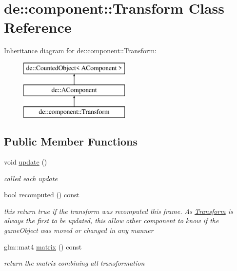 \hypertarget{classde_1_1component_1_1_transform}{
\section{de\-:\-:component\-:\-:\-Transform \-Class \-Reference}
\label{classde_1_1component_1_1_transform}
}
\-Inheritance diagram for de\-:\-:component\-:\-:\-Transform\-:\begin{figure}[H]
\begin{center}
\leavevmode
\includegraphics[height=3.000000cm]{classde_1_1component_1_1_transform}
\end{center}
\end{figure}
\subsection*{\-Public \-Member \-Functions}
\begin{DoxyCompactItemize}
\item 
\hypertarget{classde_1_1component_1_1_transform_aa633f78f603b073ded87ce3d76d68c9f}{
void \hyperlink{classde_1_1component_1_1_transform_aa633f78f603b073ded87ce3d76d68c9f}{update} ()}
\label{classde_1_1component_1_1_transform_aa633f78f603b073ded87ce3d76d68c9f}

\begin{DoxyCompactList}\small\item\em called each update \end{DoxyCompactList}\item 
\hypertarget{classde_1_1component_1_1_transform_a21e27db96b4445b5c970633265c13296}{
bool \hyperlink{classde_1_1component_1_1_transform_a21e27db96b4445b5c970633265c13296}{recomputed} () const }
\label{classde_1_1component_1_1_transform_a21e27db96b4445b5c970633265c13296}

\begin{DoxyCompactList}\small\item\em this return true if the transform was recomputed this frame. \-As \hyperlink{classde_1_1component_1_1_transform}{\-Transform} is always the first to be updated, this allow other component to know if the game\-Object was moved or changed in any manner \end{DoxyCompactList}\item 
\hypertarget{classde_1_1component_1_1_transform_a01da3717d44a091953ce85e5ca6e3a4f}{
glm\-::mat4 \hyperlink{classde_1_1component_1_1_transform_a01da3717d44a091953ce85e5ca6e3a4f}{matrix} () const }
\label{classde_1_1component_1_1_transform_a01da3717d44a091953ce85e5ca6e3a4f}

\begin{DoxyCompactList}\small\item\em return the matrix combining all transformation \end{DoxyCompactList}\end{DoxyCompactItemize}
